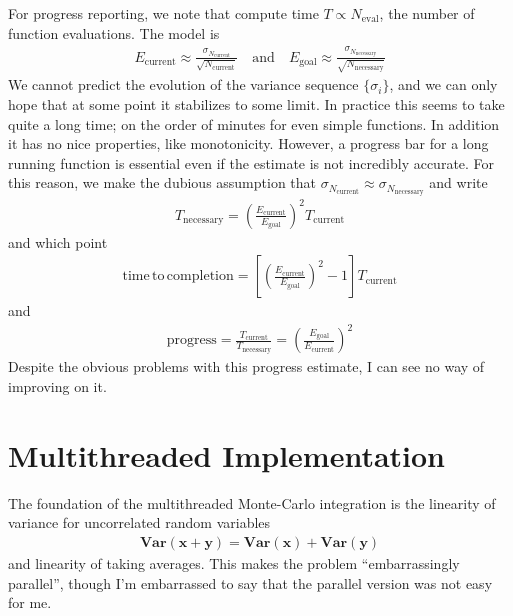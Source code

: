 \documentclass[landscape]{article}
\numberwithin{equation}{section}
\begin{document}
For progress reporting, we note that compute time $T \propto N_{\mathrm{eval}}$, the number of function evaluations.
The model is
\begin{align*}
E_{\mathrm{current}} \approx \frac{\sigma_{N_{\mathrm{current}}}}{\sqrt{N_{\mathrm{current}}}}
\quad \mathrm{and} \quad
E_{\mathrm{goal}} \approx \frac{\sigma_{N_{\mathrm{necessary}}}}{\sqrt{N_{\mathrm{necessary}}}}
\end{align*}
We cannot predict the evolution of the variance sequence $\{\sigma_{i}\}$, and we can only hope that at some point it stabilizes to some limit.
In practice this seems to take quite a long time; on the order of minutes for even simple functions.
In addition it has no nice properties, like monotonicity.
However, a progress bar for a long running function is essential even if the estimate is not incredibly accurate.
For this reason, we make the dubious assumption that $\sigma_{N_{\mathrm{current}}} \approx \sigma_{N_{\mathrm{necessary}}}$ and write
\begin{align*}
T_{\mathrm{necessary}} = \left( \frac{E_{\mathrm{current}}}{E_{\mathrm{goal}}} \right)^{2}T_{\mathrm{current}}
\end{align*}
and which point
\begin{align*}
\mathrm{time\, to\, completion } = \left[\left( \frac{E_{\mathrm{current}}}{E_{\mathrm{goal}}} \right)^{2} -1 \right]T_{\mathrm{current}}
\end{align*}
and
\begin{align*}
\mathrm{progress} = \frac{T_{\mathrm{current}}}{T_{\mathrm{necessary}}} = \left( \frac{E_{\mathrm{goal}}}{E_{\mathrm{current}}} \right)^{2}
\end{align*}
Despite the obvious problems with this progress estimate, I can see no way of improving on it.

\section{Multithreaded Implementation}

The foundation of the multithreaded Monte-Carlo integration is the linearity of variance for uncorrelated random variables
\begin{align*}
\mathbf{Var}(\mathbf{x} + \mathbf{y}) = \mathbf{Var}(\mathbf{x}) + \mathbf{Var}(\mathbf{y})
\end{align*}
and linearity of taking averages.
This makes the problem ``embarrassingly parallel'', though I'm embarrassed to say that the parallel version was not easy for me.
\end{document}
